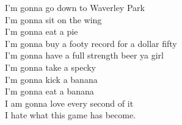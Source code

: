 I'm gonna go down to Waverley Park \\
I'm gonna sit on the wing \\
I'm gonna eat a pie \\
I'm gonna buy a footy record for a dollar fifty \\
I'm gonna have a full strength beer ya girl \\
I'm gonna take a specky \\
I'm gonna kick a banana \\
I'm gonna eat a banana \\
I am gonna love every second of it \\
I hate what this game has become. \\
